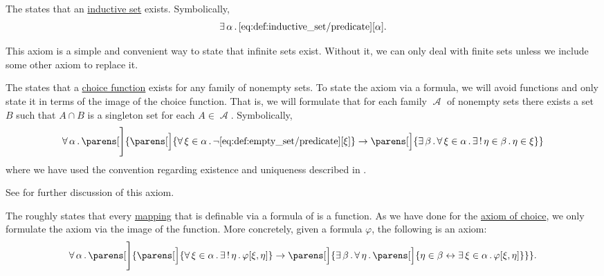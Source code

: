 \begin{definition}
\begin{thmenum}
     The  states that an \hyperref[def:inductive_set]{inductive set} exists. Symbolically,
    \begin{equation}\label{eq:def:zfc/infinity}
      \exists \thinspace \alpha \thinspace . \thinspace \ref{eq:def:inductive_set/predicate}[\alpha].
    \end{equation}

    This axiom is a simple and convenient way to state that infinite sets exist. Without it, we can only deal with finite sets unless we include some other axiom to replace it.

     The  states that a \hyperref[def:choice_function]{choice function} exists for any family of nonempty sets. To state the axiom via a formula, we will avoid functions and only state it in terms of the image of the choice function. That is, we will formulate that for each family \( \mscrA \) of nonempty sets there exists a set \( B \) such that \( A \cap B \) is a singleton set for each \( A \in \mscrA \). Symbolically,
    \begin{equation}\label{eq:def:zfc/choice}
      \qforall \alpha \parens[\Bigg]
        {
          \parens[\Big]{ \qforall {\xi \in \alpha} \neg \ref{eq:def:empty_set/predicate}[\xi] }
          \rightarrow
          \parens[\Big]{ \qexists \beta \qforall {\xi \in \alpha} \qExists {\eta \in \beta} \eta \in \xi }
        }
    \end{equation}
    where we have used the convention regarding existence and uniqueness described in .

    See  for further discussion of this axiom.

     The  roughly states that every \hyperref[rem:function_definition]{mapping} that is definable via a formula of  is a function. As we have done for the \hyperref[def:zfc/choice]{axiom of choice}, we only formulate the axiom via the image of the function. More concretely, given a formula \( \varphi \), the following is an axiom:
    \begin{equation}\label{eq:def:zfc/replacement}
      \qforall \alpha \parens[\Bigg]
        {
          \parens[\Big]{ \qforall {\xi \in \alpha} \qExists \eta \varphi[\xi, \eta] }
          \rightarrow
          \parens[\Big]{ \qexists \beta \qforall \eta \parens[\Big]{ \eta \in \beta \leftrightarrow \qexists {\xi \in \alpha} \varphi[\xi, \eta] } }
        }.
    \end{equation}


\end{thmenum}
\end{definition}
